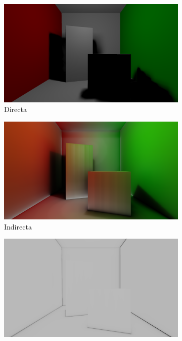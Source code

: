 \begin{figure}[H]
	\centering
	\begin{subfigure}[t]{.49\linewidth}
		\centering
		\captionsetup{justification=centering}
		\caption*{Directa}
		\includegraphics[width=\linewidth]{media/finals/cornell_direct.png}
	\end{subfigure}%
	\hspace{0.01\textwidth}
	\begin{subfigure}[t]{.49\linewidth}
		\centering
		\caption*{Indirecta}
		\captionsetup{justification=centering}
		\includegraphics[width=\linewidth]{media/finals/cornell_indirect.png}
	\end{subfigure}%
	\par\smallskip
	\begin{subfigure}[t]{.49\linewidth}
		\centering
		\captionsetup{justification=centering}
		\includegraphics[width=\linewidth]{media/finals/cornell_ao.png}

\end{subfigure}
\end{figure}
